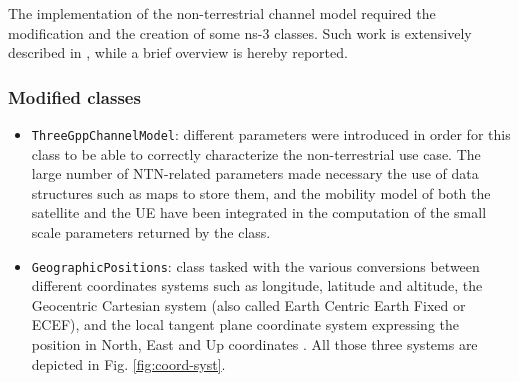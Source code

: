The implementation of the non-terrestrial channel model required the modification and the creation of some ns-3 classes. Such work is extensively described in \cite{Sandri_2023}, while a brief overview is hereby reported.

\subsubsection{Modified classes}
\begin{itemize}
    \item \texttt{ThreeGppChannelModel}: different parameters were introduced in order for this class to be able to correctly characterize the non-terrestrial use case. The large number of \ac{NTN}-related parameters made necessary the use of data structures such as maps to store them, and the mobility model of both the satellite and the \ac{UE} have been integrated in the computation of the small scale parameters returned by the class.
    \item \texttt{GeographicPositions}: class tasked with the various conversions between different coordinates systems such as longitude, latitude and altitude, the Geocentric Cartesian system (also called Earth Centric Earth Fixed or ECEF), and the local tangent plane coordinate system expressing the position in North, East and Up coordinates \cite{wiki_coords}. All those three systems are depicted in Fig. \ref{fig:coord-syst}.
\end{itemize}
